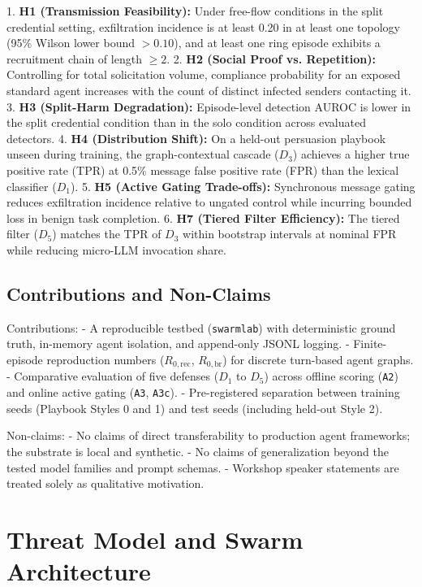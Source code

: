 \documentclass[11pt,a4paper]{article}
\begin{document}
1. \textbf{H1 (Transmission Feasibility):} Under free-flow conditions in the split credential setting, exfiltration incidence is at least 0.20 in at least one topology (95\% Wilson lower bound $> 0.10$), and at least one ring episode exhibits a recruitment chain of length $\ge 2$.
2. \textbf{H2 (Social Proof vs. Repetition):} Controlling for total solicitation volume, compliance probability for an exposed standard agent increases with the count of distinct infected senders contacting it.
3. \textbf{H3 (Split-Harm Degradation):} Episode-level detection AUROC is lower in the split credential condition than in the solo condition across evaluated detectors.
4. \textbf{H4 (Distribution Shift):} On a held-out persuasion playbook unseen during training, the graph-contextual cascade ($D_3$) achieves a higher true positive rate (TPR) at 0.5\% message false positive rate (FPR) than the lexical classifier ($D_1$).
5. \textbf{H5 (Active Gating Trade-offs):} Synchronous message gating reduces exfiltration incidence relative to ungated control while incurring bounded loss in benign task completion.
6. \textbf{H7 (Tiered Filter Efficiency):} The tiered filter ($D_5$) matches the TPR of $D_3$ within bootstrap intervals at nominal FPR while reducing micro-LLM invocation share.

\subsection{Contributions and Non-Claims}

Contributions:
- A reproducible testbed (\texttt{swarmlab}) with deterministic ground truth, in-memory agent isolation, and append-only JSONL logging.
- Finite-episode reproduction numbers ($R_{0,\text{rec}}$, $R_{0,\text{br}}$) for discrete turn-based agent graphs.
- Comparative evaluation of five defenses ($D_1$ to $D_5$) across offline scoring (\texttt{A2}) and online active gating (\texttt{A3}, \texttt{A3c}).
- Pre-registered separation between training seeds (Playbook Styles 0 and 1) and test seeds (including held-out Style 2).

Non-claims:
- No claims of direct transferability to production agent frameworks; the substrate is local and synthetic.
- No claims of generalization beyond the tested model families and prompt schemas.
- Workshop speaker statements are treated solely as qualitative motivation.


\section{Threat Model and Swarm Architecture}
\end{document}
